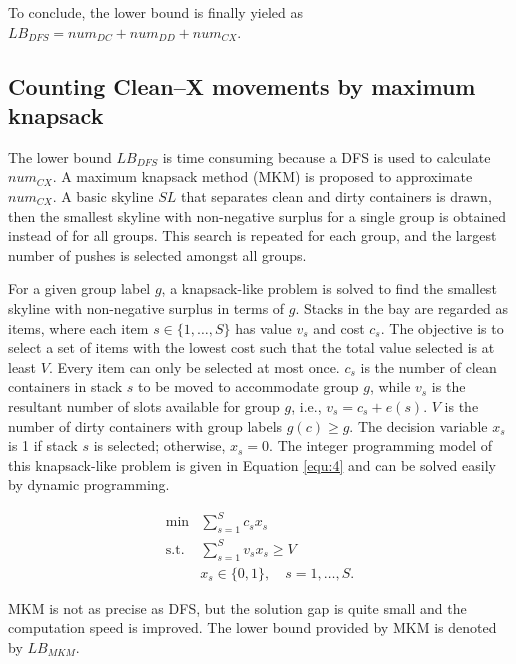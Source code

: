 \documentclass[review,3p,times,authoryear,12pt]{elsarticle}
\begin{document}
To conclude, the lower bound is finally yieled as $\mathit{LB}_\mathit{DFS}=\mathit{num}_\mathit{DC}+\mathit{num}_\mathit{DD}+\mathit{num}_\mathit{CX}$.

\subsection{Counting Clean--X movements by maximum knapsack}

The lower bound $\mathit{LB}_\mathit{DFS}$ is time consuming because a DFS is used to calculate $\mathit{num}_{\mathit{CX}}$. 
A maximum knapsack method (MKM) is proposed to approximate $\mathit{num}_{CX}$. 
A basic skyline $\mathit{SL}$ that separates clean and dirty containers is drawn, then the smallest skyline with non-negative surplus for a single group is obtained instead of for all groups. 
This search is repeated for each group, and the largest number of pushes is selected amongst all groups.

For a given group label $g$, a knapsack-like problem is solved to find the smallest skyline with non-negative surplus in terms of $g$. 
Stacks in the bay are regarded as items, where each item $s\in\{1,\dots,S\}$ has value $v_s$ and cost $c_s$. 
The objective is to select a set of items with the lowest cost such that the total value selected is at least $V$. 
Every item can only be selected at most once. 
$c_s$ is the number of clean containers in stack $s$ to be moved to accommodate group $g$, while $v_s$ is the resultant number of slots available for group $g$, i.e., $v_s=c_s+e(s)$. 
$V$ is the number of dirty containers with group labels $g(c)\ge g$. 
The decision variable $x_s$ is 1 if stack $s$ is selected; otherwise, $x_s=0$. 
The integer programming model of this knapsack-like problem is given in Equation \ref{equ:4} and can be solved easily by dynamic programming.

\begin{equation}
\label{equ:4}
\begin{array}{rl}
\min & \sum_{s=1}^S c_s x_s\\
\mathrm{s.t.} &\sum_{s=1}^S v_s x_s\ge V\\
&x_s\in\{0,1\}, \quad s=1,\dots,S\textrm{.}
\end{array}
\end{equation}

MKM is not as precise as DFS, but the solution gap is quite small and the computation speed is improved. 
The lower bound provided by MKM is denoted by $\mathit{LB}_{\mathit{MKM}}$.
\end{document}

